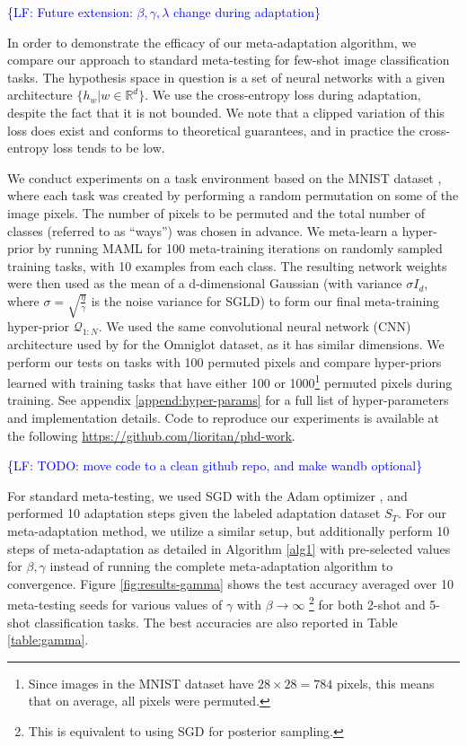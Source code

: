 \documentclass{article}
\theoremstyle{definition}
\newcommand{\LF}[1]{\textcolor{blue}{\{LF: #1\}}}
\begin{document}
\LF{Future extension: $\beta,\gamma,\lambda$ change during adaptation}

In order to demonstrate the efficacy of our meta-adaptation algorithm, we compare our approach to standard meta-testing for few-shot image classification tasks. The hypothesis space in question is a set of neural networks with a given architecture $\{h_w|w\in \mathbb{R}^d\}$. We use the cross-entropy loss during adaptation, despite the fact that it is not bounded. We note that a clipped variation of this loss does exist and conforms to theoretical guarantees, and in practice the cross-entropy loss tends to be low.

We conduct experiments on a task environment based on the MNIST dataset \citep{LeCun1998}, where each task was created by performing a random permutation on some of the image pixels. The number of pixels to be permuted and the total number of classes (referred to as ``ways'') was chosen in advance. We meta-learn a hyper-prior by running MAML \citep{Finn2017} for 100 meta-training iterations on randomly sampled training tasks, with 10 examples from each class. The resulting network weights were then used as the mean of a d-dimensional Gaussian (with variance $\sigma I_d$, where $\sigma=\sqrt{\frac{\eta}{\gamma}}$ is the noise variance for SGLD) to form our final meta-training hyper-prior $\mathcal{Q}_{1:N}$. We used the same convolutional neural network (CNN) architecture used by \citet{Vinyals2016} for the Omniglot dataset, as it has similar dimensions. We perform our tests on tasks with 100 permuted pixels and compare hyper-priors learned with training tasks that have either 100 or 1000\footnote{Since images in the MNIST dataset have $28\times 28=784$ pixels, this means that on average, all pixels were permuted.} permuted pixels during training. See appendix \ref{append:hyper-params} for a full list of hyper-parameters and implementation details. Code to reproduce our experiments is available at the following \hyperlink{Github repository}{https://github.com/lioritan/phd-work}.

\LF{TODO: move code to a clean github repo, and make wandb optional}

For standard meta-testing, we used SGD with the Adam optimizer \citep{Kingma2015}, and performed 10 adaptation steps given the labeled adaptation dataset $S_T$. For our meta-adaptation method, we utilize a similar setup, but additionally perform 10 steps of meta-adaptation as detailed in Algorithm \ref{alg1} with pre-selected values for $\beta,\gamma$ instead of running the complete meta-adaptation algorithm to convergence. Figure \ref{fig:results-gamma} shows the test accuracy averaged over 10 meta-testing seeds for various values of $\gamma$ with $\beta\rightarrow \infty$ \footnote{This is equivalent to using SGD for posterior sampling.} for both 2-shot and 5-shot classification tasks. The best accuracies are also reported in Table \ref{table:gamma}.
\end{document}
